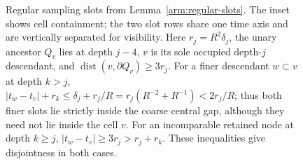 \begin{figure}[tbp]
\caption[Disjoint regular sampling slots]{%
Regular sampling slots from Lemma~\ref{arm:regular-slots}.
The inset shows cell containment; the two slot rows share one time axis
and are vertically separated for visibility.  Here $r_j=R^2\delta_j$,
the unary ancestor $Q_v$ lies at depth $j-4$, $v$ is its sole occupied
depth-$j$ descendant, and $\operatorname{dist}(v,\partial Q_v)\ge3r_j$.
For a finer descendant $w\subset v$ at depth $k>j$,
$|t_w-t_v|+r_k\le\delta_j+r_j/R
=r_j(R^{-2}+R^{-1})<2r_j/R$;
thus both finer slots lie strictly inside the coarse central gap,
although they need not lie inside the cell $v$.
For an incomparable retained node at depth $k\ge j$,
$|t_w-t_v|\ge3r_j>r_j+r_k$.
These inequalities give disjointness in both cases.}
\label{fig:regular-slots}
\end{figure}
